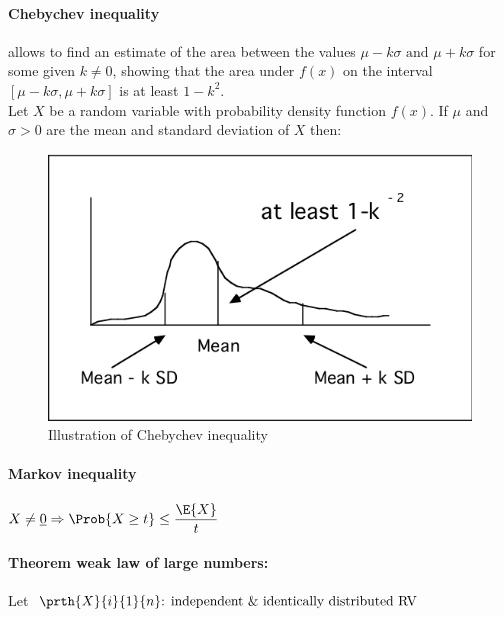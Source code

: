 \paragraph{Chebychev inequality}
allows to find an estimate of the area between the
values $\mu-k\sigma\text{ and }\mu+k\sigma$ for some given $k\neq 0$, showing
that the area under $f(x)$ on the interval $\left[\mu-k\sigma, \mu+k\sigma
\right]$ is at least $1-k^{2}$.\\
Let $X$ be a random variable with probability density function $f(x)$. If
$\mu$ and $\sigma>0$ are the mean and standard deviation of $X$ then:
\begin{center}
\end{center}
\begin{figure}[H]
	\begin{center}
		\includegraphics[width=.5\textwidth]{chapters/2_statistics/01_fundamental_probability_concepts/1_images/1_ineqChebyGraph.png}
	\end{center}
	\caption{Illustration of Chebychev inequality}
	\label{fig:fig2.01.1}
\end{figure}



\paragraph{Markov inequality}
\begin{center}
		$X\neq\underline{0}\Rightarrow \Prob{X\geq t}\leq \dfrac{\E{X}}{t}$
\end{center}
\paragraph{Theorem weak law of large numbers:}
Let $\prth{X}{i}{1}{n}\text{: independent \& identically distributed RV}$
\begin{center}
\end{center}
